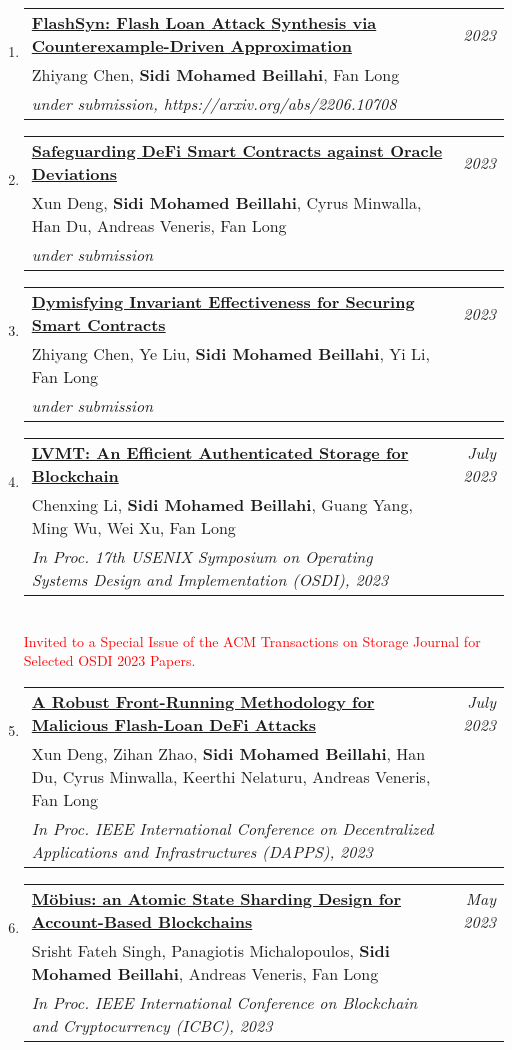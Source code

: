 \documentclass[10pt]{article}
\makeatletter
\newcommand{\lbar}[1]{{\color{#1}\ding{118}}\hspace*{2pt}}
\newenvironment{benumerate}[2]{
    \let\oldItem\item
    \def\item{\addtocounter{enumi}{-2}\oldItem}
    \begin{enumerate}[#2] \itemsep3pt
    \setcounter{enumi}{#1}
    \addtocounter{enumi}{1}}
  {\end{enumerate}}
\newenvironment{publication}[5]
{ \item
  \begin{tabular*}{7.5in}{p{6.3in}@{\extracolsep{\fill}}r}
    \href{#1}{\textbf{#2}} & \textit{#3}\\ #4 &\\ \textit{#5}&\\
  \end{tabular*}
} {}
\newenvironment{region}[3]{%
  \vspace*{0.5ex}
  {\scalebox{1.4}{\textbf{#1}}}
  \begin{benumerate}{#3}{\color{RoyalBlue}#2}}
  {\end{benumerate}\vspace{0.8ex}}
\makeatother
\begin{document}
\begin{region} {\lbar{purple}Conference Publications}{{C}1}{17}

  \begin{publication} {https://arxiv.org/pdf/2206.10708.pdf}
		{FlashSyn: Flash Loan Attack Synthesis via Counterexample-Driven Approximation} 
		{2023} {Zhiyang Chen, \textbf{Sidi Mohamed Beillahi}, Fan Long}
		{under submission, https://arxiv.org/abs/2206.10708}
  \end{publication}

  \begin{publication} {https://beillahi.github.io}
		{Safeguarding DeFi Smart Contracts against Oracle Deviations} 
		{2023} {Xun Deng, \textbf{Sidi Mohamed Beillahi}, Cyrus Minwalla, Han Du, Andreas Veneris, Fan Long}
		{under submission}
  \end{publication}

  \begin{publication} {https://beillahi.github.io}
		{Dymisfying Invariant Effectiveness for Securing Smart Contracts} 
		{2023} {Zhiyang Chen, Ye Liu, \textbf{Sidi Mohamed Beillahi}, Yi Li, Fan Long}
		{under submission}
  \end{publication}
  

  \begin{publication} {https://beillahi.github.io}
		{LVMT: An Efficient Authenticated Storage for Blockchain} 
		{July 2023} {Chenxing Li, \textbf{Sidi Mohamed Beillahi}, Guang Yang, Ming Wu, Wei Xu, Fan Long}
		{In Proc. 17th USENIX Symposium on Operating Systems Design and Implementation (OSDI), 2023}
    {\\ \textcolor{red}{Invited to a Special Issue of the ACM Transactions on Storage Journal for Selected OSDI 2023 Papers.}}
  \end{publication}

  \begin{publication} {https://beillahi.github.io}
		{A Robust Front-Running Methodology for Malicious Flash-Loan DeFi Attacks} 
		{July 2023} {Xun Deng, Zihan Zhao, \textbf{Sidi Mohamed Beillahi}, Han Du, Cyrus Minwalla, Keerthi Nelaturu, 
    Andreas Veneris, Fan Long}
		{In Proc. IEEE International Conference on Decentralized Applications and Infrastructures (DAPPS), 2023}
  \end{publication}
 
  \begin{publication} {https://beillahi.github.io}
		{Möbius: an Atomic State Sharding Design for Account-Based Blockchains} 
		{May 2023} {Srisht Fateh Singh, Panagiotis Michalopoulos, \textbf{Sidi Mohamed Beillahi}, Andreas Veneris, Fan Long}
		{In Proc. IEEE International Conference on Blockchain and Cryptocurrency (ICBC), 2023}
  \end{publication}


\end{region}
\end{document}
